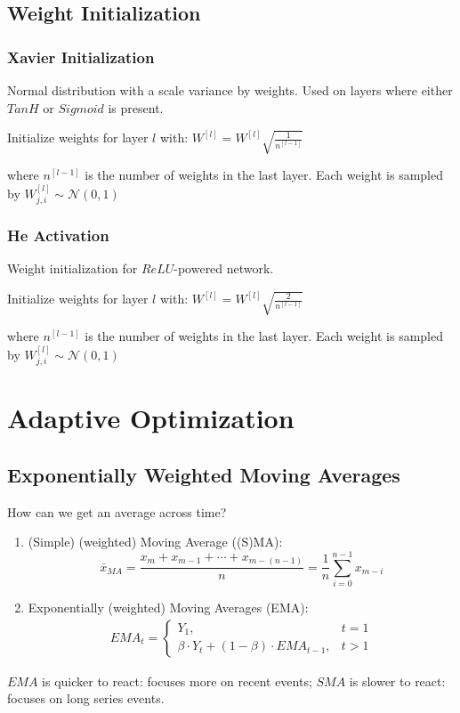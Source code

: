 \documentclass[11pt,a4paper]{article}
\begin{document}
\subsection{Weight Initialization}
\subsubsection{Xavier Initialization}
Normal distribution with a scale variance by weights. Used on layers where either $TanH$ or $Sigmoid$ is present.
\begin{center}
    Initialize weights for layer $l$ with: $W^{[l]}=W^{[l]}\sqrt{\frac{1}{n^{[l-1]}}}$
\end{center}
where $n^{[l-1]}$ is the number of weights in the last layer. Each weight is sampled by $W_{j,i}^{[l]}\sim \mathcal{N}(0,1)$

\subsubsection{He Activation}
Weight initialization for $ReLU$-powered network.
\begin{center}
    Initialize weights for layer $l$ with: $W^{[l]}=W^{[l]}\sqrt{\frac{2}{n^{[l-1]}}}$
\end{center}
where $n^{[l-1]}$ is the number of weights in the last layer. Each weight is sampled by $W_{j,i}^{[l]}\sim \mathcal{N}(0,1)$


\section{Adaptive Optimization}
\subsection{Exponentially Weighted Moving Averages}
How can we get an average across time?
\begin{enumerate}
    \item (Simple) (weighted) Moving Average ((S)MA): $$\bar{x}_{MA}=\frac{x_m+x_{m-1}+\cdots+x_{m-(n-1)}}{n}=\frac{1}{n}\sum_{i=0}^{n-1}x_{m-i}$$
    \item Exponentially (weighted) Moving Averages (EMA):
    \begin{equation}
        \begin{aligned}
            {EMA}_{t}=\left\{\begin{matrix}
                Y_1,&t=1\\
                \beta \cdot Y_t+(1-\beta)\cdot {EMA}_{t-1},&t>1
            \end{matrix}\right.
        \end{aligned}
        \nonumber
    \end{equation}
\end{enumerate}
$EMA$ is quicker to react: focuses more on recent events; $SMA$ is slower to react: focuses on long series events.
\end{document}
